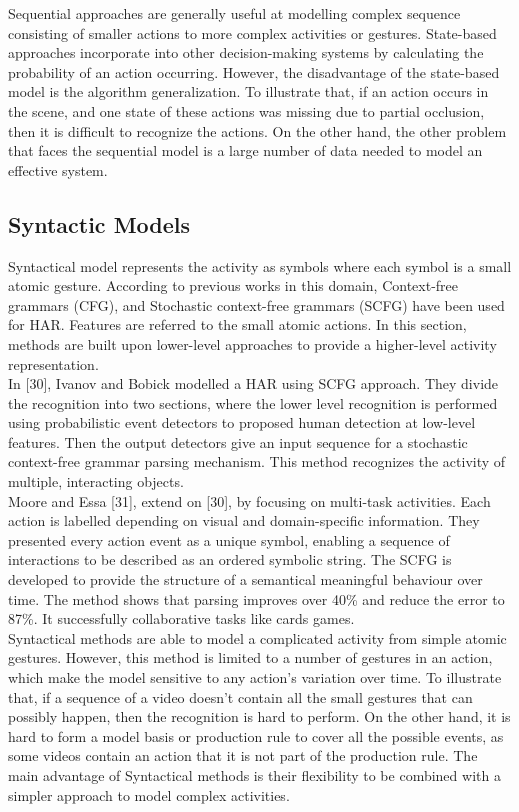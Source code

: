 Sequential approaches are generally useful at modelling complex sequence consisting of smaller actions to more complex activities or gestures. State-based approaches incorporate into other decision-making systems by calculating the probability of an action occurring. However, the disadvantage of the state-based model is the algorithm generalization. To illustrate that, if an action occurs in the scene, and one state of these actions was missing due to partial occlusion, then it is difficult to recognize the actions. On the other hand, the other problem that faces the sequential model is a large number of data needed to model an effective system. 

\subsection{Syntactic Models}
\hspace{5mm} Syntactical model represents the activity as symbols where each symbol is a small atomic gesture. According to previous works in this domain, Context-free grammars (CFG), and Stochastic context-free grammars (SCFG) have been used for HAR. Features are referred to the small atomic actions. In this section, methods are built upon lower-level approaches to provide a higher-level activity representation.\\

In [30], Ivanov and Bobick modelled a HAR using SCFG approach. They divide the recognition into two sections, where the lower level recognition is performed using probabilistic event detectors to proposed human detection at low-level features. Then the output detectors give an input sequence for a stochastic context-free grammar parsing mechanism. This method recognizes the activity of multiple, interacting objects.\\

Moore and Essa [31], extend on [30], by focusing on multi-task activities. Each action is labelled depending on visual and domain-specific information. They presented every action event as a unique symbol, enabling a sequence of interactions to be described as an ordered symbolic string. The SCFG is developed to provide the structure of a semantical meaningful behaviour over time. The method shows that parsing improves over 40\% and reduce the error to 87\%. It successfully collaborative tasks like cards games.\\

Syntactical methods are able to model a complicated activity from simple atomic gestures. However, this method is limited to a number of gestures in an action, which make the model sensitive to any action’s variation over time. To illustrate that, if a sequence of a video doesn’t contain all the small gestures that can possibly happen, then the recognition is hard to perform. On the other hand, it is hard to form a model basis or production rule to cover all the possible events, as some videos contain an action that it is not part of the production rule. The main advantage of Syntactical methods is their flexibility to be combined with a simpler approach to model complex activities.

